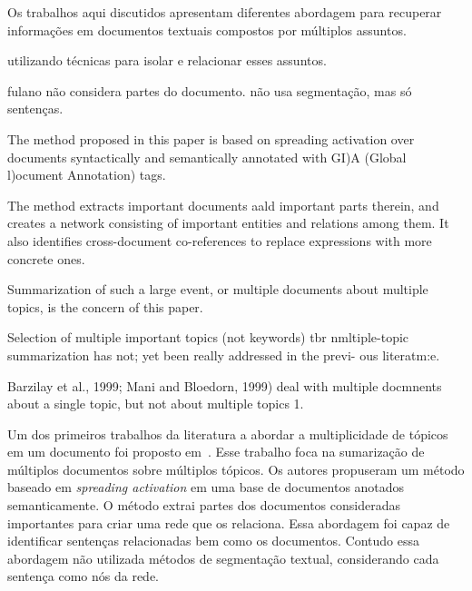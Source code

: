 Os trabalhos aqui discutidos apresentam diferentes abordagem para recuperar informações em documentos textuais compostos por múltiplos assuntos.




utilizando técnicas para isolar e relacionar esses assuntos.




fulano não considera partes do documento. 
não usa segmentação, mas só sentenças.



The method proposed in this paper is
based on spreading activation over documents
syntactically and semantically annotated with
GI)A (Global l)ocument Annotation) tags.
 
The method extracts important documents aald 
important parts therein, and creates a network
consisting of important entities and relations
among them. It also identifies cross-document
co-references to replace expressions with more
concrete ones.



Summarization of such a large event, or multiple 
documents about multiple topics, is the
concern of this paper.


Selection of multiple important topics (not
keywords) tbr nmltiple-topic summarization has
not; yet been really addressed in the previ-
ous literatm:e.

 
Barzilay et al., 1999; Mani and Bloedorn, 1999) deal with multiple docmnents about a single topic, but not about multiple topics 1.  




Um dos primeiros trabalhos da literatura a abordar a multiplicidade de tópicos em um documento foi proposto em~\cite{}. Esse trabalho foca na sumarização de múltiplos documentos sobre múltiplos tópicos. Os autores propuseram um método baseado em \textit{spreading activation} em uma base de documentos anotados semanticamente. O método extrai partes dos documentos consideradas importantes para criar uma rede que os relaciona. Essa abordagem foi capaz de identificar sentenças relacionadas bem como os documentos. Contudo essa abordagem não utilizada métodos de segmentação textual, considerando cada sentença como nós da rede. 










